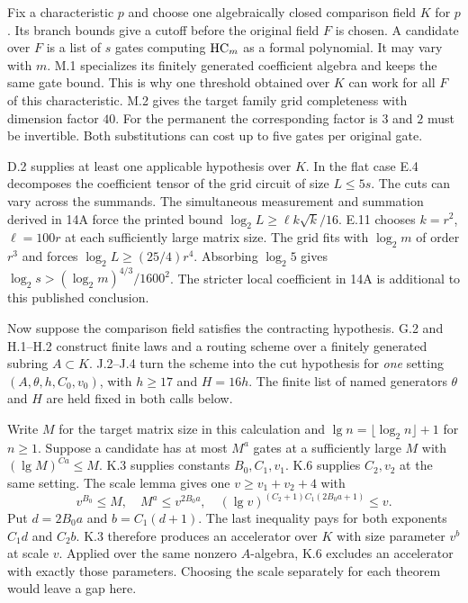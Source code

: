 \clearpage
{}\label{sec:14chain}
Fix a characteristic $p$ and choose one algebraically closed comparison field $K$ for $p$. Its branch bounds give a cutoff before the original field $F$ is chosen. A candidate over $F$ is a list of $s$ gates computing $\mathrm{HC}_m$ as a formal polynomial. It may vary with $m$. M.1 specializes its finitely generated coefficient algebra and keeps the same gate bound. This is why one threshold obtained over $K$ can work for all $F$ of this characteristic. M.2 gives the target family grid completeness with dimension factor $40$. For the permanent the corresponding factor is $3$ and $2$ must be invertible. Both substitutions can cost up to five gates per original gate.

D.2 supplies at least one applicable hypothesis over $K$. In the flat case E.4 decomposes the coefficient tensor of the grid circuit of size $L\le5s$. The cuts can vary across the summands. The simultaneous measurement and summation derived in 14A force the printed bound $\log_2 L\ge\ell k\sqrt{k}/16$. E.11 chooses $k=r^2$, $\ell=100r$ at each sufficiently large matrix size. The grid fits with $\log_2 m$ of order $r^3$ and forces $\log_2 L\ge (25/4)r^4$. Absorbing $\log_2 5$ gives $\log_2 s>(\log_2 m)^{4/3}/1600^2$. The stricter local coefficient in 14A is additional to this published conclusion.

Now suppose the comparison field satisfies the contracting hypothesis. G.2 and H.1--H.2 construct finite laws and a routing scheme over a finitely generated subring $A\subset K$. J.2--J.4 turn the scheme into the cut hypothesis for \emph{one} setting $(A,\theta,h,C_0,v_0)$, with $h\ge17$ and $H=16h$. The finite list of named generators $\theta$ and $H$ are held fixed in both calls below.

Write $M$ for the target matrix size in this calculation and $\lg n=\lfloor\log_2 n\rfloor+1$ for $n\ge1$. Suppose a candidate has at most $M^a$ gates at a sufficiently large $M$ with $(\lg M)^{Ca}\le M$. K.3 supplies constants $B_0,C_1,v_1$. K.6 supplies $C_2,v_2$ at the same setting. The scale lemma gives one $v\ge v_1+v_2+4$ with
\[
 v^{B_0}\le M,\quad M^a\le v^{2B_0a},\quad
 (\lg v)^{(C_2+1)C_1(2B_0a+1)}\le v.
\]
Put $d=2B_0a$ and $b=C_1(d+1)$. The last inequality pays for both exponents $C_1d$ and $C_2b$. K.3 therefore produces an accelerator over $K$ with size parameter $v^b$ at scale $v$. Applied over the same nonzero $A$-algebra, K.6 excludes an accelerator with exactly those parameters. Choosing the scale separately for each theorem would leave a gap here.

